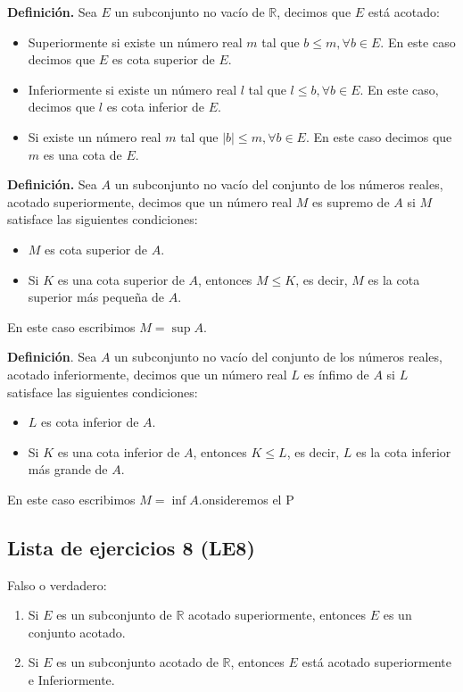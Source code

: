 \documentclass[11pt]{article}
\newcommand{\R}{\mathbb{R}}
\begin{document}
\pagebreak

\textbf{Definición.} Sea $E$ un subconjunto no vacío de $\R$, decimos que $E$ está acotado: \begin{itemize}
    \item Superiormente si existe un número real $m$ tal que $b \leq m, \forall b\in E$. En este caso decimos que $E$ es cota superior de $E$.
    \item Inferiormente si existe un número real $l$ tal que $l \leq b, \forall b\in E$. En este caso, decimos que $l$ es cota inferior de $E$.
    \item Si existe un número real $m$ tal que $|b|\leq m,\forall b \in E$. En este caso decimos que $m$ es una cota de $E$.
\end{itemize}

\textbf{Definición.} Sea $A$ un subconjunto no vacío del conjunto de los números reales, acotado superiormente, decimos que un número real $M$ es supremo de $A$ si $M$ satisface las siguientes condiciones: \begin{itemize}
    \item $M$ es cota superior de $A$.
    \item Si $K$ es una cota superior de $A$, entonces $M\leq K$, es decir, $M$ es la cota superior más pequeña de $A$.
\end{itemize}

En este caso escribimos $M=\sup{A}$.

\textbf{Definición}. Sea $A$ un subconjunto no vacío del conjunto de los números reales, acotado inferiormente, decimos que un número real $L$ es ínfimo de $A$ si $L$ satisface las siguientes condiciones: \begin{itemize}
    \item $L$ es cota inferior de $A$.
    \item Si $K$ es una cota inferior de $A$, entonces $K\leq L$, es decir, $L$ es la cota inferior más grande de $A$.
\end{itemize}

En este caso escribimos $M=\inf{A}$.onsideremos el P

\subsection*{Lista de ejercicios 8 (LE8)}

Falso o verdadero: \begin{enumerate}[label=\arabic*.]
    \item Si $E$ es un subconjunto de $\R$ acotado superiormente, entonces $E$ es un conjunto acotado.
    \item Si $E$ es un subconjunto acotado de $\R$, entonces $E$ está acotado superiormente e Inferiormente.
\end{enumerate}
\end{document}
